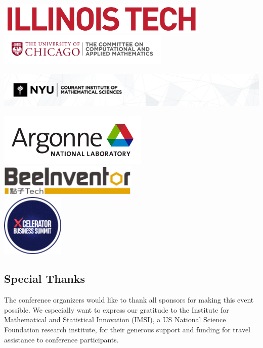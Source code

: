 \begin{center}
\includegraphics[height=1.5cm]{Photos/illinois_tech_logo_full.png} \\[1em]
\includegraphics[height=1.5cm]{Photos/uchicago_cam_logo.png} \\[1em]
\includegraphics[height=2.5cm]{Photos/nyu_courant_logo.png} \\[1em]
\includegraphics[height=2.5cm]{Photos/argonne_logo.png} \\[1em]
\includegraphics[height=1.5cm]{Photos/beeinventor_logo.png} \\[1em]
\includegraphics[height=3cm]{Photos/xcelerator_logo.png}

\end{center}


\subsection{Special Thanks}

The conference organizers would like to thank all sponsors for making this
event possible. We especially want to express our gratitude to the Institute for Mathematical and Statistical Innovation (IMSI), a US National Science Foundation research institute, for their generous support and funding for travel assistance to conference participants.

